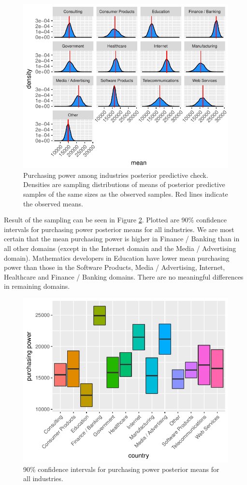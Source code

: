 \documentclass{article}
\begin{document}
\begin{figure}[H]
\centering
\includegraphics{report-043}
\caption{Purchasing power among industries posterior predictive check. Densities are sampling distributions of means of posterior predictive samples of the same sizes as the observed samples. Red lines indicate the observed means.}\label{fig_12}
\end{figure}

Result of the sampling can be seen in Figure \ref{fig_13}. Plotted are 90\% confidence intervals for purchasing power posterior means for all industries. We are most certain that the mean purchasing power is higher in Finance / Banking than in all other domains (except in the Internet domain and the Media / Advertising domain). Mathematics developers in Education have lower mean purchasing power than those in the Software Products, Media / Advertising, Internet, Healthcare and Finance / Banking domains. There are no meaningful differences in remaining domains.


\begin{figure}[H]
\centering
\includegraphics{report-045}
\caption{90\% confidence intervals for purchasing power posterior means for all industries.}\label{fig_13}
\end{figure}
\end{document}
